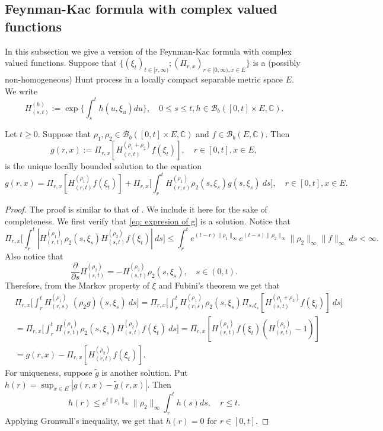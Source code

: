 \documentclass[EJP]{ejpecp} %
\begin{document}
\subsection{Feynman-Kac formula with complex valued functions}
\label{seq: complex Feynman-Kac transform}
	In this subsection we give a version of the Feynman-Kac formula with complex valued functions.
	Suppose that $\{(\xi_t)_{t \in [r,\infty)}; (\Pi_{r,x})_{r\in [0,\infty), x\in E}\}$ is a (possibly non-homogeneous) Hunt process in a locally compact separable metric space $E$.
	We write
\[
 	H^{(h)}_{(s,t)}
 	:= \exp\Big\{\int_s^t h(u,\xi_u) du\Big\},
 	\quad 0 \leq s \leq t, h \in \mathcal B_b([0,t] \times E,\mathbb C).
\]

\begin{lemma}
\label{eq: complex FK}
	Let $t \geq 0$. Suppose that $\rho_1, \rho_2\in \mathcal B_b([0,t] \times E, \mathbb C)$ and $f\in \mathcal B_b(E, \mathbb C)$.
	Then
\begin{equation}
\label{eq: expresion of g}
    g(r,x)
    := \Pi_{r,x}[ H_{(r,t)}^{(\rho_1+\rho_2)} f(\xi_t)],\quad r \in [0,t], x\in E,
\end{equation}
	is the unique locally bounded solution to the equation
\[
    g(r,x)
    = \Pi_{r,x} [ H_{(r,t)}^{(\rho_1)} f(\xi_t)]+\Pi_{r,x} \Big[ \int_r^tH_{(r,s)}^{(\rho_1)}\rho_2(s,\xi_s) g(s,\xi_s)~ds \Big],\quad r \in [0,t], x\in E.
\]
\end{lemma}

\begin{proof}
	The proof is similar to that of \cite[Lemma A.1.5]{Dynkin1993Superprocesses}. We include it here for the sake of completeness.
	We first verify that \eqref{eq: expresion of g} is a solution.
	Notice that
\[
    \Pi_{r,x} \Big[ \int_r^t | H_{(r,t)}^{(\rho_1)}\rho_2(s,\xi_s) H_{(s,t)}^{(\rho_2)} f(\xi_t)| ~ds \Big]
    \leq  \int_r^t e^{(t-r)\|\rho_1\|_\infty}e^{(t-s)\|\rho_2\|_\infty}\|\rho_2\|_\infty\|f\|_\infty ~ds
    < \infty.
\]
	Also notice that
\begin{equation}
\label{eq: crucial for Feynman-Kac}
    \frac{\partial}{\partial s} H^{(\rho_2)}_{(s,t)}= -H^{(\rho_2)}_{(s,t)}\rho_2(s,\xi_s),
    \quad s\in (0,t).
\end{equation}
	Therefore, from the Markov property of $\xi$ and Fubini's theorem we get that
\begin{align}
    & \Pi_{r,x} \Big[ \int_r^tH_{(r,s)}^{(\rho_1)}~(\rho_2 g)(s,\xi_s)~ds \Big]
   	=\Pi_{r,x} \Big[ \int_r^t H_{(r,s)}^{(\rho_1)}\rho_2(s,\xi_s) \Pi_{s,\xi_s}[ H_{(s,t)}^{(\rho_1+\rho_2)} f(\xi_t)]~ds \Big] \\
    & = \Pi_{r,x} \Big[ \int_r^t H_{(r,t)}^{(\rho_1)}\rho_2(s,\xi_s) H_{(s,t)}^{(\rho_2)} f(\xi_t) ~ds \Big]
    = \Pi_{r,x} [ H_{(r,t)}^{(\rho_1)}f(\xi_t)(H_{(r,t)}^{(\rho_2)} - 1)] \\
    & = g(r,x) - \Pi_{r,x} [ H_{(r,t)}^{(\rho_2)} f(\xi_t)].
\end{align}
	For uniqueness, suppose  $\widetilde g$ is another solution. Put $h(r) = \sup_{x\in E}|g(r,x) - \widetilde g(r,x)|$.
	Then
\[
	h(r)
	\leq e^{t\|\rho_1\|_\infty}\|\rho_2\|_\infty \int_r^t h(s)ds,
    \quad r\le t.
\]
	Applying Gronwall's inequality, we get that $h(r) =  0$ for $r\in [0,t]$.
\end{proof}
\end{document}
